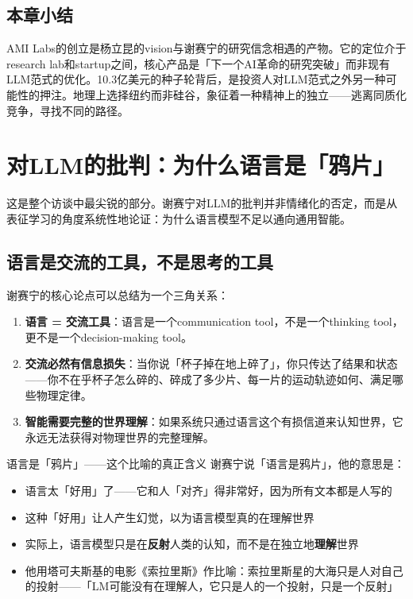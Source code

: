 \documentclass[a4paper]{article}
\begin{document}
\subsection{本章小结}
AMI Labs的创立是杨立昆的vision与谢赛宁的研究信念相遇的产物。它的定位介于research lab和startup之间，核心产品是「下一个AI革命的研究突破」而非现有LLM范式的优化。10.3亿美元的种子轮背后，是投资人对LLM范式之外另一种可能性的押注。地理上选择纽约而非硅谷，象征着一种精神上的独立——逃离同质化竞争，寻找不同的路径。

\section{对LLM的批判：为什么语言是「鸦片」}

这是整个访谈中最尖锐的部分。谢赛宁对LLM的批判并非情绪化的否定，而是从表征学习的角度系统性地论证：为什么语言模型不足以通向通用智能。

\subsection{语言是交流的工具，不是思考的工具}

谢赛宁的核心论点可以总结为一个三角关系：

\begin{enumerate}
  \item \textbf{语言 = 交流工具}：语言是一个communication tool，不是一个thinking tool，更不是一个decision-making tool。
  \item \textbf{交流必然有信息损失}：当你说「杯子掉在地上碎了」，你只传达了结果和状态——你不在乎杯子怎么碎的、碎成了多少片、每一片的运动轨迹如何、满足哪些物理定律。
  \item \textbf{智能需要完整的世界理解}：如果系统只通过语言这个有损信道来认知世界，它永远无法获得对物理世界的完整理解。
\end{enumerate}

\begin{importantbox}{语言是「鸦片」——这个比喻的真正含义}
谢赛宁说「语言是鸦片」，他的意思是：
\begin{itemize}
  \item 语言太「好用」了——它和人「对齐」得非常好，因为所有文本都是人写的
  \item 这种「好用」让人产生幻觉，以为语言模型真的在理解世界
  \item 实际上，语言模型只是在\textbf{反射}人类的认知，而不是在独立地\textbf{理解}世界
  \item 他用塔可夫斯基的电影《索拉里斯》作比喻：索拉里斯星的大海只是人对自己的投射——「LM可能没有在理解人，它只是人的一个投射，只是一个反射」
\end{itemize}
\end{importantbox}
\end{document}
